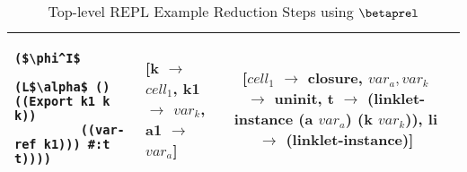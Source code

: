 \begin{table}[!htbp]
\begin{tabular}{l >{\centering\arraybackslash}m{} c c}
\begin{lstlisting}[style=numberless]
	($\phi^I$
		(L$\alpha$ () ((Export k1 k k))
		 ((var-ref k1))) #:t t))))\end{lstlisting} & \thead{[k $\rightarrow$ $cell_1$,\\k1 $\rightarrow$ $var_k$,\\a1 $\rightarrow$ $var_a$]} & \thead{[$cell_1$ $\rightarrow$ closure,\\$var_a,var_k$ $\rightarrow$ uninit,\\t $\rightarrow$ (linklet-instance\\(a $var_a$) (k $var_k$)),\\li $\rightarrow$ (linklet-instance)]} \\ \hline
  \end{tabular}
  \caption{Top-level REPL Example Reduction Steps using $\betaprel$}
  \label{table:toplevel-example-step-by-step-formal}
\end{table}